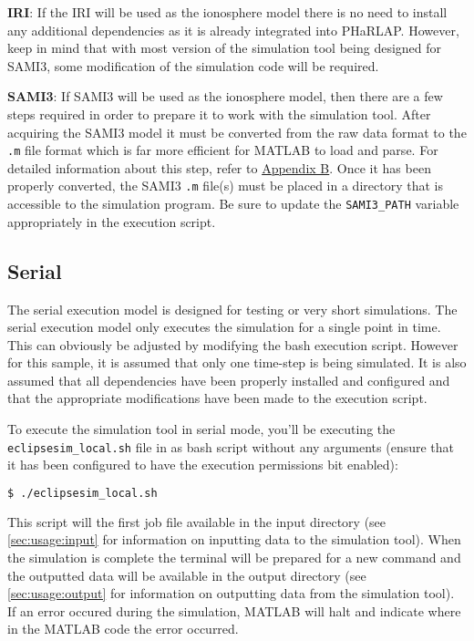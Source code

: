 \documentclass[12pt,letterpaper]{article}
\begin{document}
{\bf IRI}: If the IRI will be used as the ionosphere model there is no need to
install any additional dependencies as it is already integrated into
PHaRLAP. However, keep in mind that with most version of the simulation tool
being designed for SAMI3, some modification of the simulation code will be
required.

{\bf SAMI3}: If SAMI3 will be used as the ionosphere model, then there are a few
steps required in order to prepare it to work with the simulation tool. After
acquiring the SAMI3 model it must be converted from the raw data format to the
{\tt *.m} file format which is far more efficient for MATLAB to load and
parse. For detailed information about this step, refer to
\hyperref[sec:sami3_df]{Appendix B}. Once it has been properly converted, the
SAMI3 {\tt *.m} file(s) must be placed in a directory that is accessible to the
simulation program. Be sure to update the {\tt SAMI3\_PATH} variable
appropriately in the execution script.

\subsection{Serial}
\label{sec:usage:serial}

The serial execution model is designed for testing or very short
simulations. The serial execution model only executes the simulation for a
single point in time. This can obviously be adjusted by modifying the bash
execution script. However for this sample, it is assumed that only one time-step
is being simulated. It is also assumed that all dependencies have been properly
installed and configured and that the appropriate modifications have been made
to the execution script.

To execute the simulation tool in serial mode, you'll be executing the {\tt
  eclipsesim\_local.sh} file in as bash script without any arguments (ensure
that it has been configured to have the execution permissions bit enabled):

\begin{lstlisting}[language=bash]
  $ ./eclipsesim_local.sh
\end{lstlisting}

This script will the first job file available in the input directory (see
\autoref{sec:usage:input} for information on inputting data to the simulation
tool). When the simulation is complete the terminal will be prepared for a new
command and the outputted data will be available in the output directory (see
\autoref{sec:usage:output} for information on outputting data from the
simulation tool). If an error occured during the simulation, MATLAB will halt
and indicate where in the MATLAB code the error occurred.
\end{document}
